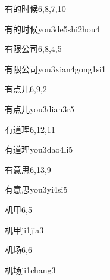 \begin{entry}{有的时候}{6,8,7,10}
  \begin{phonetics}{有的时候}{you3de5shi2hou4}
  \end{phonetics}
\end{entry}

\begin{entry}{有限公司}{6,8,4,5}
  \begin{phonetics}{有限公司}{you3xian4gong1si1}
  \end{phonetics}
\end{entry}

\begin{entry}{有点儿}{6,9,2}
  \begin{phonetics}{有点儿}{you3dian3r5}
  \end{phonetics}
\end{entry}

\begin{entry}{有道理}{6,12,11}
  \begin{phonetics}{有道理}{you3dao4li5}
  \end{phonetics}
\end{entry}

\begin{entry}{有意思}{6,13,9}
  \begin{phonetics}{有意思}{you3yi4si5}
  \end{phonetics}
\end{entry}

\begin{entry}{机甲}{6,5}
  \begin{phonetics}{机甲}{ji1jia3}
  \end{phonetics}
\end{entry}

\begin{entry}{机场}{6,6}
  \begin{phonetics}{机场}{ji1chang3}
  \end{phonetics}
\end{entry}

